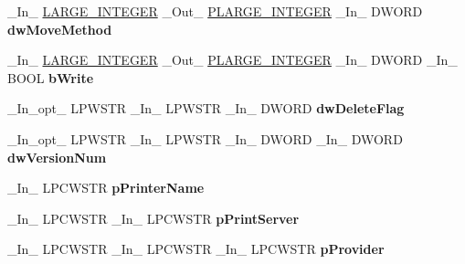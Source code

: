 \begin{DoxyCompactItemize}
\+\_\+\+In\+\_\+ \hyperlink{union___l_a_r_g_e___i_n_t_e_g_e_r}{L\+A\+R\+G\+E\+\_\+\+I\+N\+T\+E\+G\+ER} \+\_\+\+Out\+\_\+ \hyperlink{union___l_a_r_g_e___i_n_t_e_g_e_r}{P\+L\+A\+R\+G\+E\+\_\+\+I\+N\+T\+E\+G\+ER} \+\_\+\+In\+\_\+ D\+W\+O\+RD {\bfseries dw\+Move\+Method}
\item 
\mbox{\label{struct___p_r_i_n_t_p_r_o_v_i_d_o_r_a76d49da2a57fbe5491a1bf70e5733d60}} 
\+\_\+\+In\+\_\+ \hyperlink{union___l_a_r_g_e___i_n_t_e_g_e_r}{L\+A\+R\+G\+E\+\_\+\+I\+N\+T\+E\+G\+ER} \+\_\+\+Out\+\_\+ \hyperlink{union___l_a_r_g_e___i_n_t_e_g_e_r}{P\+L\+A\+R\+G\+E\+\_\+\+I\+N\+T\+E\+G\+ER} \+\_\+\+In\+\_\+ D\+W\+O\+RD \+\_\+\+In\+\_\+ B\+O\+OL {\bfseries b\+Write}
\item 
\mbox{\label{struct___p_r_i_n_t_p_r_o_v_i_d_o_r_a0e249b40999a9a8b6db6b471383cd265}} 
\+\_\+\+In\+\_\+opt\+\_\+ L\+P\+W\+S\+TR \+\_\+\+In\+\_\+ L\+P\+W\+S\+TR \+\_\+\+In\+\_\+ D\+W\+O\+RD {\bfseries dw\+Delete\+Flag}
\item 
\mbox{\label{struct___p_r_i_n_t_p_r_o_v_i_d_o_r_adb14ea811218b4b8123e857d80966692}} 
\+\_\+\+In\+\_\+opt\+\_\+ L\+P\+W\+S\+TR \+\_\+\+In\+\_\+ L\+P\+W\+S\+TR \+\_\+\+In\+\_\+ D\+W\+O\+RD \+\_\+\+In\+\_\+ D\+W\+O\+RD {\bfseries dw\+Version\+Num}
\item 
\mbox{\label{struct___p_r_i_n_t_p_r_o_v_i_d_o_r_a15613401ecb5bcdd999215663fbfd80c}} 
\+\_\+\+In\+\_\+ L\+P\+C\+W\+S\+TR {\bfseries p\+Printer\+Name}
\item 
\mbox{\label{struct___p_r_i_n_t_p_r_o_v_i_d_o_r_a1bd0ef52f050ec854d0bc5ec0d234bec}} 
\+\_\+\+In\+\_\+ L\+P\+C\+W\+S\+TR \+\_\+\+In\+\_\+ L\+P\+C\+W\+S\+TR {\bfseries p\+Print\+Server}
\item 
\mbox{\label{struct___p_r_i_n_t_p_r_o_v_i_d_o_r_aa88eb3d766f94f3b789efbbf55af553e}} 
\+\_\+\+In\+\_\+ L\+P\+C\+W\+S\+TR \+\_\+\+In\+\_\+ L\+P\+C\+W\+S\+TR \+\_\+\+In\+\_\+ L\+P\+C\+W\+S\+TR {\bfseries p\+Provider}
\item 
\mbox{\label{struct___p_r_i_n_t_p_r_o_v_i_d_o_r_a55dda96379670e9268958aac353b9c5f}} 

\end{DoxyCompactItemize}
